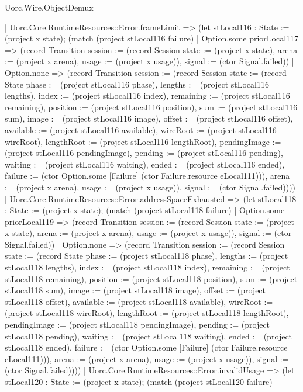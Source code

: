\begin{lexlean}{Uorc.Wire.ObjectDemux}
\begin{semanticmodule}
{      | Uorc.Core.RuntimeResources::Error.frameLimit => (let stLocal116 : State := (project x state); (match (project stLocal116 failure)
        | Option.some priorLocal117 => (record Transition {session := (record Session {state := (project x state), arena := (project x arena), usage := (project x usage)}), signal := (ctor Signal.failed)})
        | Option.none => (record Transition {session := (record Session {state := (record State {phase := (project stLocal116 phase), lengths := (project stLocal116 lengths), index := (project stLocal116 index), remaining := (project stLocal116 remaining), position := (project stLocal116 position), sum := (project stLocal116 sum), image := (project stLocal116 image), offset := (project stLocal116 offset), available := (project stLocal116 available), wireRoot := (project stLocal116 wireRoot), lengthRoot := (project stLocal116 lengthRoot), pendingImage := (project stLocal116 pendingImage), pending := (project stLocal116 pending), waiting := (project stLocal116 waiting), ended := (project stLocal116 ended), failure := (ctor Option.some [Failure] (ctor Failure.resource eLocal111))}), arena := (project x arena), usage := (project x usage)}), signal := (ctor Signal.failed)})))
      | Uorc.Core.RuntimeResources::Error.addressSpaceExhausted => (let stLocal118 : State := (project x state); (match (project stLocal118 failure)
        | Option.some priorLocal119 => (record Transition {session := (record Session {state := (project x state), arena := (project x arena), usage := (project x usage)}), signal := (ctor Signal.failed)})
        | Option.none => (record Transition {session := (record Session {state := (record State {phase := (project stLocal118 phase), lengths := (project stLocal118 lengths), index := (project stLocal118 index), remaining := (project stLocal118 remaining), position := (project stLocal118 position), sum := (project stLocal118 sum), image := (project stLocal118 image), offset := (project stLocal118 offset), available := (project stLocal118 available), wireRoot := (project stLocal118 wireRoot), lengthRoot := (project stLocal118 lengthRoot), pendingImage := (project stLocal118 pendingImage), pending := (project stLocal118 pending), waiting := (project stLocal118 waiting), ended := (project stLocal118 ended), failure := (ctor Option.some [Failure] (ctor Failure.resource eLocal111))}), arena := (project x arena), usage := (project x usage)}), signal := (ctor Signal.failed)})))
      | Uorc.Core.RuntimeResources::Error.invalidUsage => (let stLocal120 : State := (project x state); (match (project stLocal120 failure)
}
\end{semanticmodule}
\end{lexlean}
